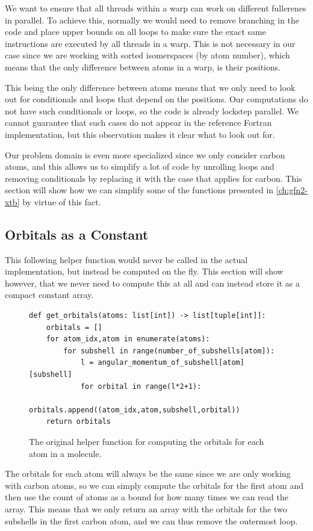 We want to ensure that all threads within a warp can work on different fullerenes in parallel. To achieve this, normally we would need to remove branching in the code and place upper bounds on all loops to make sure the exact same instructions are executed by all threads in a warp. This is not necessary in our case since we are working with sorted isomerspaces (by atom number), which means that the only difference between atoms in a warp, is their positions.

This being the only difference between atoms means that we only need to look out for conditionals and loops that depend on the positions. Our computations do not have such conditionals or loops, so the code is already lockstep parallel. We cannot guarantee that such cases do not appear in the reference Fortran implementation, but this observation makes it clear what to look out for.

Our problem domain is even more specialized since we only consider carbon atoms, and this allows us to simplify a lot of code by unrolling loops and removing conditionals by replacing it with the case that applies for carbon. This section will show how we can simplify some of the functions presented in \ref{ch:gfn2-xtb} by virtue of this fact.


\subsection{Orbitals as a Constant}

This following helper function would never be called in the actual implementation, but instead be computed on the fly. This section will show however, that we never need to compute this at all and can instead store it as a compact constant array. 

\begin{figure}[H]
\begin{verbatim}
def get_orbitals(atoms: list[int]) -> list[tuple[int]]:
    orbitals = []
    for atom_idx,atom in enumerate(atoms):
        for subshell in range(number_of_subshells[atom]):
            l = angular_momentum_of_subshell[atom][subshell] 
            for orbital in range(l*2+1):
                orbitals.append((atom_idx,atom,subshell,orbital))
    return orbitals
\end{verbatim}
\caption{The original helper function for computing the orbitals for each atom in a molecule.}
\end{figure}

The orbitals for each atom will always be the same since we are only working with carbon atoms, so we can simply compute the orbitals for the first atom and then use the count of atoms as a bound for how many times we can read the array. This means that we only return an array with the orbitals for the two subshells in the first carbon atom, and we can thus remove the outermost loop.

